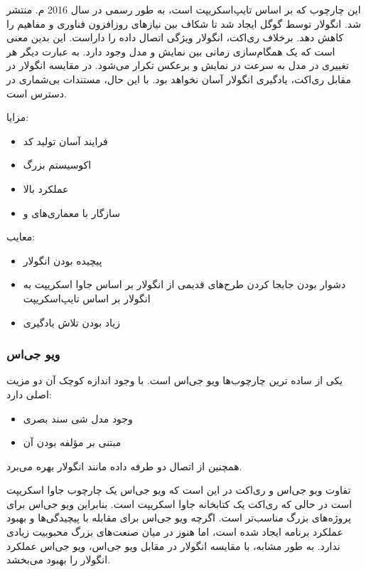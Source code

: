 این چارچوب که بر اساس تایپ‌اسکریپت است، به طور رسمی در سال 2016 م. منتشر شد. انگولار توسط گوگل ایجاد شد تا شکاف بین نیازهای روزافزون فناوری و مفاهیم  را کاهش دهد. برخلاف ری‌اکت، انگولار ویژگی اتصال داده را داراست. این بدین معنی است که یک همگام‌سازی زمانی بین نمایش و مدل وجود دارد. به عبارت دیگر هر تغییری در مدل به سرعت در نمایش و برعکس تکرار می‌شود. در مقایسه انگولار در مقابل ری‌اکت، یادگیری انگولار آسان نخواهد بود. با این حال، مستندات بی‌شماری در دسترس است.


مزایا:
\begin{itemize}
    \item فرایند آسان تولید کد
    \item اکوسیستم بزرگ
    \item عملکرد بالا
    \item سازگار با معماری‌های  و 
\end{itemize}


معایب:

\begin{itemize}
    \item پیچیده بودن انگولار
    \item دشوار بودن جابجا کردن طرح‌های قدیمی از انگولار بر اساس جاوا اسکریپت به انگولار بر اساس تایپ‌اسکریپت
    \item زیاد بودن تلاش یادگیری
\end{itemize}


\newpage

\subsubsection{ویو جی‌اس}

یکی از ساده ترین چارچوب‌ها ویو جی‌اس است. با وجود اندازه کوچک آن دو مزیت اصلی دارد:

\begin{itemize}
    \item وجود مدل شی سند بصری
    \item مبتنی بر مؤلفه بودن آن 
\end{itemize}
همچنین از اتصال دو طرفه داده مانند انگولار بهره می‌برد.


تفاوت ویو جی‌اس و ری‌اکت در این است که ویو جی‌اس یک چارچوب جاوا اسکریپت است در حالی که ری‌اکت یک کتابخانه جاوا اسکریپت است. بنابراین ویو جی‌اس برای پروژه‌های بزرگ مناسب‌تر است. اگرچه ویو جی‌اس برای مقابله با پیچیدگی‌ها و بهبود عملکرد برنامه ایجاد شده است، اما هنوز در میان صنعت‌های بزرگ محبوبیت زیادی ندارد. به طور مشابه، با مقایسه انگولار در مقابل ویو جی‌اس، ویو جی‌اس عملکرد انگولار را بهبود می‌بخشد.


